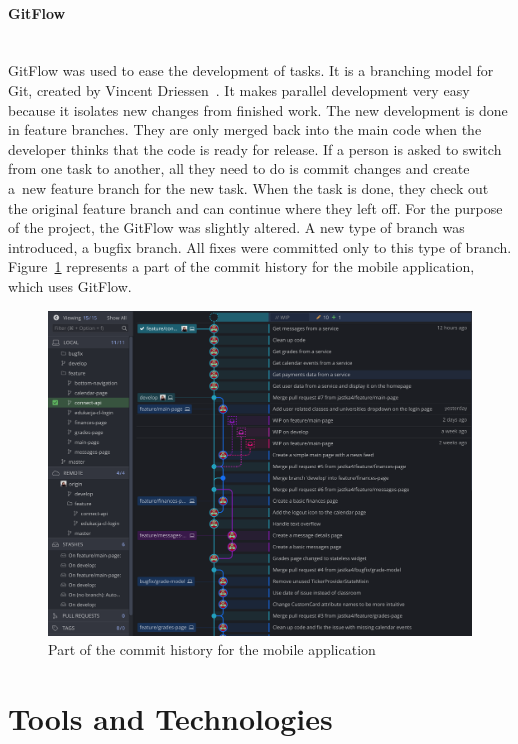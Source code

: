 \paragraph{\large{GitFlow}}\mbox{}\\[2pt]
GitFlow was used to ease the development of tasks. It is a branching model for Git, created by Vincent Driessen~\cite{gitflow}. It makes parallel development very easy because it isolates new changes from finished work. The new development is done in feature branches. They are only merged back into the main code when the developer thinks that the code is ready for release. If a person is asked to switch from one task to another, all they need to do is commit changes and create a~new feature branch for the new task. When the task is done, they check out the original feature branch and can continue where they left off.
For the purpose of the project, the GitFlow was slightly altered. A new type of branch was introduced, a bugfix branch. All fixes were committed only to this type of branch. Figure~\ref{fig:gitflow} represents a part of the commit history for the mobile application, which uses GitFlow.

\begin{figure}[htb]
    \centering
    \includegraphics[width=.95\textwidth]{fig04/gitflow.png}
    \caption{Part of the commit history for the mobile application} \label{fig:gitflow}
\end{figure}

\section{Tools and Technologies}
